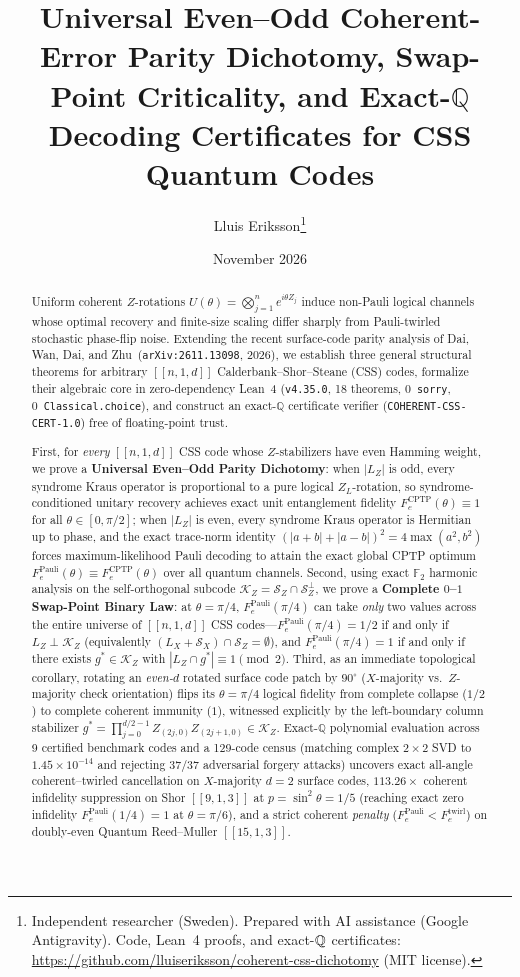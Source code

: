 \documentclass[11pt,a4paper]{article}
\title{\textbf{Universal Even--Odd Coherent-Error Parity Dichotomy, Swap-Point Criticality, and Exact-$\mathbb{Q}$ Decoding Certificates for CSS Quantum Codes}}
\author{Lluis Eriksson\thanks{Independent researcher (Sweden). Prepared with AI assistance (Google Antigravity). Code, Lean~4 proofs, and exact-$\Q$ certificates: \url{https://github.com/lluiseriksson/coherent-css-dichotomy} (MIT license).}}
\date{November 2026}
\theoremstyle{plain}
\theoremstyle{definition}
\newcommand{\Ftwo}{\mathbb{F}_2}
\newcommand{\Q}{\mathbb{Q}}
\newcommand{\SZ}{\mathcal{S}_Z}
\newcommand{\SX}{\mathcal{S}_X}
\newcommand{\KZ}{\mathcal{K}_Z}
\begin{document}
\maketitle

\begin{abstract}
Uniform coherent $Z$-rotations $U(\theta) = \bigotimes_{j=1}^{n} e^{i\theta Z_j}$ induce non-Pauli logical channels whose optimal recovery and finite-size scaling differ sharply from Pauli-twirled stochastic phase-flip noise. Extending the recent surface-code parity analysis of Dai, Wan, Dai, and Zhu~(\texttt{arXiv:2611.13098}, 2026), we establish three general structural theorems for arbitrary $[[n, 1, d]]$ Calderbank--Shor--Steane (CSS) codes, formalize their algebraic core in zero-dependency Lean~4 (\texttt{v4.35.0}, 18 theorems, 0~\texttt{sorry}, 0~\texttt{Classical.choice}), and construct an exact-$\Q$ certificate verifier (\texttt{COHERENT-CSS-CERT-1.0}) free of floating-point trust.

First, for \emph{every} $[[n,1,d]]$ CSS code whose $Z$-stabilizers have even Hamming weight, we prove a \textbf{Universal Even--Odd Parity Dichotomy}: when $|L_Z|$ is odd, every syndrome Kraus operator is proportional to a pure logical $Z_L$-rotation, so syndrome-conditioned unitary recovery achieves exact unit entanglement fidelity $F_e^{\mathrm{CPTP}}(\theta) \equiv 1$ for all $\theta \in [0,\pi/2]$; when $|L_Z|$ is even, every syndrome Kraus operator is Hermitian up to phase, and the exact trace-norm identity $(|a+b|+|a-b|)^2 = 4\max(a^2,b^2)$ forces maximum-likelihood Pauli decoding to attain the exact global CPTP optimum $F_e^{\mathrm{Pauli}}(\theta) \equiv F_e^{\mathrm{CPTP}}(\theta)$ over all quantum channels. Second, using exact $\Ftwo$ harmonic analysis on the self-orthogonal subcode $\KZ = \SZ \cap \SZ^\perp$, we prove a \textbf{Complete $0$--$1$ Swap-Point Binary Law}: at $\theta = \pi/4$, $F_e^{\mathrm{Pauli}}(\pi/4)$ can take \emph{only} two values across the entire universe of $[[n,1,d]]$ CSS codes---$F_e^{\mathrm{Pauli}}(\pi/4) = 1/2$ if and only if $L_Z \perp \KZ$ (equivalently $(L_X + \SX) \cap \SZ = \emptyset$), and $F_e^{\mathrm{Pauli}}(\pi/4) = 1$ if and only if there exists $g^* \in \KZ$ with $|L_Z \cap g^*| \equiv 1 \pmod 2$. Third, as an immediate topological corollary, rotating an \emph{even-$d$} rotated surface code patch by $90^\circ$ ($X$-majority vs.\ $Z$-majority check orientation) flips its $\theta=\pi/4$ logical fidelity from complete collapse ($1/2$) to complete coherent immunity ($1$), witnessed explicitly by the left-boundary column stabilizer $g^* = \prod_{j=0}^{d/2-1} Z_{(2j,0)} Z_{(2j+1,0)} \in \KZ$. Exact-$\Q$ polynomial evaluation across 9 certified benchmark codes and a 129-code census (matching complex $2\times 2$ SVD to $1.45\times 10^{-14}$ and rejecting 37/37 adversarial forgery attacks) uncovers exact all-angle coherent--twirled cancellation on $X$-majority $d=2$ surface codes, $113.26\times$ coherent infidelity suppression on Shor $[[9,1,3]]$ at $p=\sin^2\theta=1/5$ (reaching exact zero infidelity $F_e^{\mathrm{Pauli}}(1/4) = 1$ at $\theta=\pi/6$), and a strict coherent \emph{penalty} ($F_e^{\mathrm{Pauli}} < F_e^{\mathrm{twirl}}$) on doubly-even Quantum Reed--Muller $[[15,1,3]]$.
\end{abstract}
\end{document}
